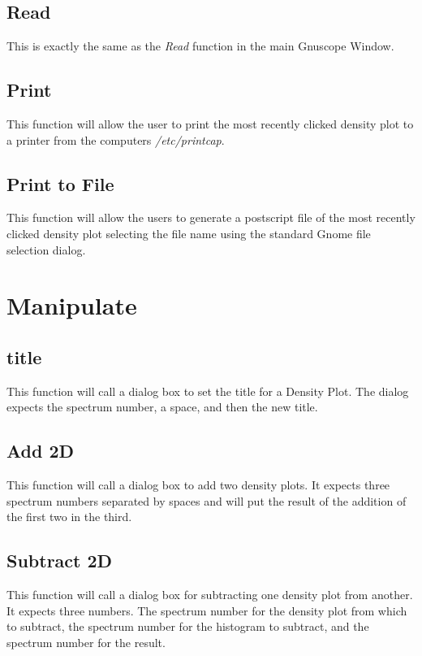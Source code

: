 \subsection{Read}

This is exactly the same as the {\it Read} function in the main Gnuscope Window.

\subsection{Print}

This function will allow the user to print the most recently clicked density plot to a printer from the computers {\it /etc/printcap}.

\subsection{Print to File}

This function will allow the users to generate a postscript file of the most recently clicked density plot selecting the file name using the standard Gnome file selection dialog.

\section{Manipulate}

\subsection{title}

This function will call a dialog box to set the title for a Density Plot.  The dialog expects the spectrum number, a space, and then the new title.

\subsection{Add 2D}

This function will call a dialog box to add two density plots.  It expects three spectrum numbers separated by spaces and will put the result of the addition of the first two in the third.

\subsection{Subtract 2D}

This function will call a dialog box for subtracting one density plot from another.  It expects three numbers.  The spectrum number for the density plot from which to subtract, the spectrum number for the histogram to subtract, and the spectrum number for the result.

